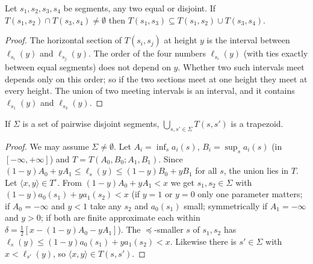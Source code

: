 \begin{lemma}\label{lem:th-lemma23}
Let $s_1,s_2,s_3,s_4$ be segments, any two equal or disjoint. If $T(s_1,s_2)\cap T(s_3,s_4)\ne\emptyset$ then
$T(s_1,s_3)\subseteq T(s_1,s_2)\cup T(s_3,s_4)$.
\end{lemma}
\begin{proof}
The horizontal section of $T(s_i,s_j)$ at height $y$ is the interval between $\ell_{s_i}(y)$ and $\ell_{s_j}(y)$. The order of the
four numbers $\ell_{s_i}(y)$ (with ties exactly between equal segments) does not depend on $y$. Whether two such intervals meet
depends only on this order; so if the two sections meet at one height they meet at every height. The union of two meeting
intervals is an interval, and it contains $\ell_{s_1}(y)$ and $\ell_{s_3}(y)$.
\end{proof}

\begin{lemma}\label{lem:th-lemma24}
If $\Sigma$ is a set of pairwise disjoint segments, $\bigcup_{s,s'\in\Sigma}T(s,s')$ is a trapezoid.
\end{lemma}
\begin{proof}
We may assume $\Sigma\ne\emptyset$. Let $A_i=\inf_sa_i(s)$, $B_i=\sup_sa_i(s)$ (in $[-\infty,+\infty]$) and $T=T(A_0,B_0;A_1,B_1)$.
Since $(1-y)A_0+yA_1\le\ell_s(y)\le(1-y)B_0+yB_1$ for all $s$, the union lies in $T$. Let $\langle x,y\rangle\in T^\circ$. From
$(1-y)A_0+yA_1<x$ we get $s_1,s_2\in\Sigma$ with $(1-y)a_0(s_1)+ya_1(s_2)<x$ (if $y=1$ or $y=0$
only one parameter matters; if $A_0=-\infty$ and $y<1$ take any $s_2$ and $a_0(s_1)$ small; symmetrically if $A_1=-\infty$ and $y>0$;
if both are finite approximate each within $\delta=\frac12[x-(1-y)A_0-yA_1]$). The
$\preceq$-smaller $s$ of $s_1,s_2$ has $\ell_s(y)\le(1-y)a_0(s_1)+ya_1(s_2)<x$. Likewise there is $s'\in\Sigma$ with $x<\ell_{s'}(y)$,
so $\langle x,y\rangle\in T(s,s')$.
\end{proof}


